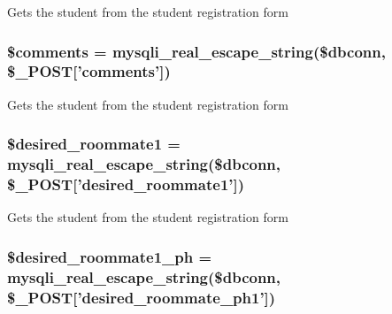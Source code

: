 \-Gets the student from the student registration form \hypertarget{admin__view_2validate_2studentVal_8php_a35e8cdeb473a5eb016fea893d14de951}{
\subsubsection[{\$comments}]{\setlength{\rightskip}{0pt plus 5cm}\$comments = mysqli\-\_\-real\-\_\-escape\-\_\-string(\$dbconn, \$\-\_\-\-P\-O\-S\-T\mbox{[}'comments'\mbox{]})}}\label{admin__view_2validate_2studentVal_8php_a35e8cdeb473a5eb016fea893d14de951}
\-Gets the student from the student registration form \hypertarget{admin__view_2validate_2studentVal_8php_a9c454efdb922da9127af82e94ee399a1}{
\subsubsection[{\$desired\-\_\-roommate1}]{\setlength{\rightskip}{0pt plus 5cm}\$desired\-\_\-roommate1 = mysqli\-\_\-real\-\_\-escape\-\_\-string(\$dbconn, \$\-\_\-\-P\-O\-S\-T\mbox{[}'desired\-\_\-roommate1'\mbox{]})}}\label{admin__view_2validate_2studentVal_8php_a9c454efdb922da9127af82e94ee399a1}
\-Gets the student from the student registration form \hypertarget{admin__view_2validate_2studentVal_8php_a5982e6f9a315f1a035bc2b440b67f187}{
\subsubsection[{\$desired\-\_\-roommate1\-\_\-ph}]{\setlength{\rightskip}{0pt plus 5cm}\$desired\-\_\-roommate1\-\_\-ph = mysqli\-\_\-real\-\_\-escape\-\_\-string(\$dbconn, \$\-\_\-\-P\-O\-S\-T\mbox{[}'desired\-\_\-roommate\-\_\-ph1'\mbox{]})}}\label{admin__view_2validate_2studentVal_8php_a5982e6f9a315f1a035bc2b440b67f187}
